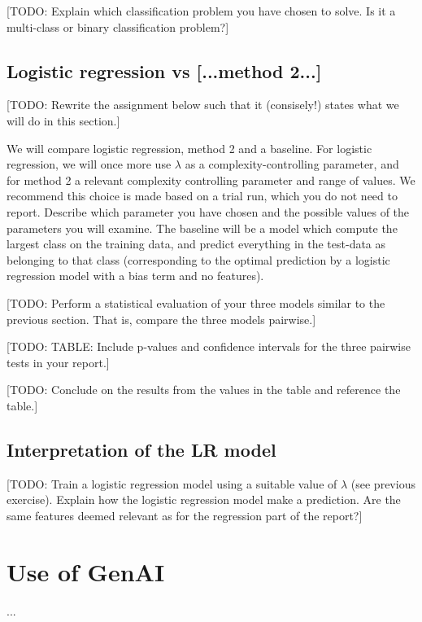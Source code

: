 \documentclass[dtu]{dtuarticle}
\newcommand{\todo}[1]{\color{red}[TODO: #1]\color{black}}
\begin{document}
	\todo{Explain which classification problem you have chosen to solve. Is it a multi-class or binary
		classification problem?}

	\subsection{Logistic regression vs [...method 2...]}

	\todo{Rewrite the assignment below such that it (consisely!) states what we will do in this section.}

	We will compare logistic regression, method 2 and a baseline. For logistic regression, we
	will once more use $\lambda$ as a complexity-controlling parameter, and for method 2 a relevant
	complexity controlling parameter and range of values. We recommend this choice is made
	based on a trial run, which you do not need to report. Describe which parameter you have
	chosen and the possible values of the parameters you will examine. The baseline will be a
	model which compute the largest class on the training data, and predict everything in the
	test-data as belonging to that class (corresponding to the optimal prediction by a logistic
	regression model with a bias term and no features).

	\todo{Perform a statistical evaluation of your three models similar to the previous section. That
		is, compare the three models pairwise.}

	\todo{TABLE: Include p-values and confidence intervals for the three pairwise tests in your report.}

	\todo{Conclude on the results from the values in the table and reference the table.}

	\subsection{Interpretation of the LR model}

	\todo{Train a logistic regression model using a suitable value of $\lambda$ (see previous exercise). Explain
		how the logistic regression model make a prediction. Are the same features deemed relevant
		as for the regression part of the report?}


	\section*{Use of GenAI}

	...

	
	
\end{document}

